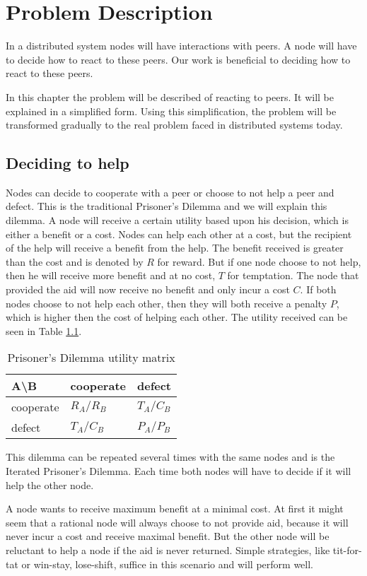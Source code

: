 \chapter{Problem Description}
In a distributed system nodes will have interactions with peers.
A node will have to decide how to react to these peers.
Our work is beneficial to deciding how to react to these peers.

In this chapter the problem will be described of reacting to peers.
It will be explained in a simplified form.
Using this simplification, the problem will be transformed gradually
to the real problem faced in distributed systems today.

\section{Deciding to help}
Nodes can decide to cooperate with a peer or choose to not help a peer and defect.
This is the traditional Prisoner's Dilemma 
and we will explain this dilemma\cite{Nowak-PrisonerDilemma}\cite{Lai-Incentives}.
A node will receive a certain utility based upon his decision, which is either a benefit or a cost.
Nodes can help each other at a cost, but the recipient of the help will receive a benefit from the help.
The benefit received is greater than the cost and is denoted by $R$ for reward.
But if one node choose to not help, then he will receive more benefit and at no cost, $T$ for temptation.
The node that provided the aid will now receive no benefit and only incur a cost $C$.
If both nodes choose to not help each other, 
then they will both receive a penalty $P$, which is higher then the cost of helping each other.
The utility received can be seen in Table \ref{tab:pd-um}.

\begin{table}[h]
\center
	\begin{tabular}{l|ll}
	A\textbackslash B       & cooperate  & defect     \\ \hline
	cooperate & $R_A /R_B$ & $T_A /C_B$ \\
	defect    & $T_A /C_B$ & $P_A /P_B$
	\end{tabular}
\caption{Prisoner's Dilemma utility matrix}
\label{tab:pd-um}
\end{table}

This dilemma can be repeated several times with the same nodes and is the Iterated Prisoner's Dilemma.
Each time both nodes will have to decide if it will help the other node.

A node wants to receive maximum benefit at a minimal cost.
At first it might seem that a rational node will always choose to not provide aid,
because it will never incur a cost and receive maximal benefit.
But the other node will be reluctant to help a node if the aid is never returned.
Simple strategies, like tit-for-tat or win-stay, lose-shift, suffice in this scenario
and will perform well\cite{Nowak-Cooperation}.

